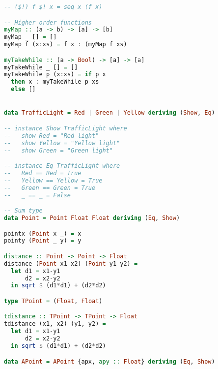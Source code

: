 \begin{lstlisting}[language=Haskell]
-- ($!) f $! x = seq x (f x)

-- Higher order functions
myMap :: (a -> b) -> [a] -> [b]
myMap _ [] = []
myMap f (x:xs) = f x : (myMap f xs)

myTakeWhile :: (a -> Bool) -> [a] -> [a]
myTakeWhile _ [] = []
myTakeWhile p (x:xs) = if p x
  then x : myTakeWhile p xs
  else []


data TrafficLight = Red | Green | Yellow deriving (Show, Eq)

-- instance Show TrafficLight where
--   show Red = "Red light"
--   show Yellow = "Yellow light"
--   show Green = "Green light"

-- instance Eq TrafficLight where
--   Red == Red = True
--   Yellow == Yellow = True
--   Green == Green = True
--   _ == _ = False

-- Sum type
data Point = Point Float Float deriving (Eq, Show)

pointx (Point x _) = x
pointy (Point _ y) = y

distance :: Point -> Point -> Float
distance (Point x1 x2) (Point y1 y2) =
  let d1 = x1-y1
      d2 = x2-y2
  in sqrt $ (d1*d1) + (d2*d2)

type TPoint = (Float, Float)

tdistance :: TPoint -> TPoint -> Float
tdistance (x1, x2) (y1, y2) =
  let d1 = x1-y1
      d2 = x2-y2
  in sqrt $ (d1*d1) + (d2*d2)

data APoint = APoint {apx, apy :: Float} deriving (Eq, Show)
\end{lstlisting}